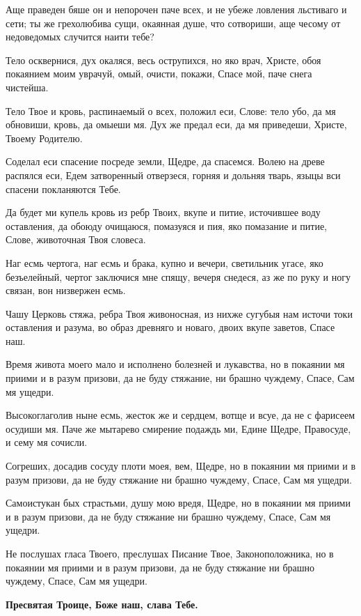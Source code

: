 Аще праведен бяше он и непорочен паче всех, и не убеже ловления льстиваго и сети; ты же грехолюбива сущи, окаянная душе, что сотвориши, аще чесому от недоведомых случится наити тебе?


Тело осквернися, дух окаляся, весь острупихся, но яко врач, Христе, обоя покаянием моим уврачуй, омый, очисти, покажи, Спасе мой, паче снега чистейша.


Тело Твое и кровь, распинаемый о всех, положил еси, Слове: тело убо, да мя обновиши, кровь, да омыеши мя. Дух же предал еси, да мя приведеши, Христе, Твоему Родителю.


Соделал еси спасение посреде земли, Щедре, да спасемся. Волею на древе распялся еси, Едем затворенный отверзеся, горняя и дольняя тварь, языцы вси спасени покланяются Тебе.


Да будет ми купель кровь из ребр Твоих, вкупе и питие, источившее воду оставления, да обоюду очищаюся, помазуяся и пия, яко помазание и питие, Слове, животочная Твоя словеса.


Наг есмь чертога, наг есмь и брака, купно и вечери, светильник угасе, яко безъелейный, чертог заключися мне спящу, вечеря снедеся, аз же по руку и ногу связан, вон низвержен есмь.


Чашу Церковь стяжа, ребра Твоя живоносная, из нихже сугубыя нам источи токи оставления и разума, во образ древняго и новаго, двоих вкупе заветов, Спасе наш.


Время живота моего мало и исполнено болезней и лукавства, но в покаянии мя приими и в разум призови, да не буду стяжание, ни брашно чуждему, Спасе, Сам мя ущедри.


Высокоглаголив ныне есмь, жесток же и сердцем, вотще и всуе, да не с фарисеем осудиши мя. Паче же мытарево смирение подаждь ми, Едине Щедре, Правосуде, и сему мя сочисли.


Согреших, досадив сосуду плоти моея, вем, Щедре, но в покаянии мя приими и в разум призови, да не буду стяжание ни брашно чуждему, Спасе, Сам мя ущедри.


Самоистукан бых страстьми, душу мою вредя, Щедре, но в покаянии мя приими и в разум призови, да не буду стяжание ни брашно чуждему, Спасе, Сам мя ущедри.


Не послушах гласа Твоего, преслушах Писание Твое, Законоположника, но в покаянии мя приими и в разум призови, да не буду стяжание ни брашно чуждему, Спасе, Сам мя ущедри.


\bfseries Пресвятая Троице, Боже наш, слава Тебе.





